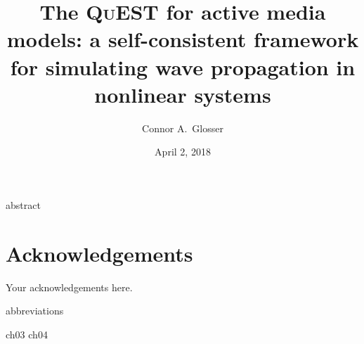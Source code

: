 \documentclass[mixedtoc]{msu-thesis-custom}
\title{The \textsc{QuEST} for active media models: a self-consistent framework for simulating wave propagation in nonlinear systems}
\author{Connor A.\ Glosser}
\date{April 2, 2018}
\begin{document}
\frontmatter
\maketitlepage

{abstract}

\clearpage

\makecopyrightpage

%
%
\clearpage
\chapter*{Acknowledgements}
\DoubleSpacing %
Your acknowledgements here.
%
\clearpage
\SingleSpacing
\tableofcontents* %
\clearpage
\listoftables %
\clearpage
\listoffigures %

%
\makenomenclature
{abbreviations}

\mainmatter
%

{ch03}
{ch04}

%
%
\end{document}
